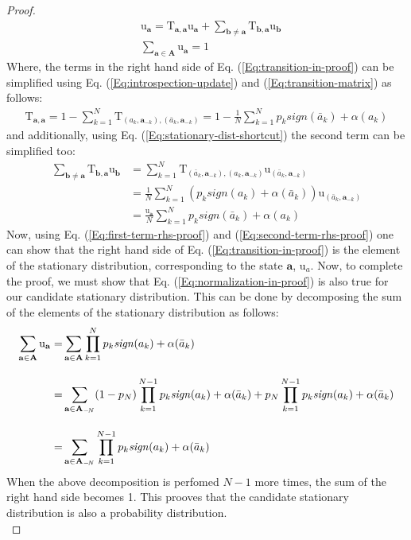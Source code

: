 \documentclass[11pt]{article}
\theoremstyle{plainCl1}
\theoremstyle{plainCl2}
\newcommand{\A}{\mathbf{A}}
\newcommand{\abf}{\mathbf{a}}
\newcommand{\bbf}{\mathbf{b}}
\begin{document}
\begin{proof}
\begin{align}
\label{Eq:transition-in-proof}
&\mathrm{u}_\abf = \mathrm{T}_{\abf,\abf} \mathrm{u}_\abf  + \sum_{\bbf \neq \abf} \mathrm{T}_{\bbf, \abf} \mathrm{u}_{\bbf}  \\[10pt] 
\label{Eq:normalization-in-proof}
&\sum_{\abf \in \A} \mathrm{u}_{\abf}= 1
\end{align}
Where, the terms in the right hand side of Eq. (\ref{Eq:transition-in-proof}) can be simplified using Eq. (\ref{Eq:introspection-update}) and (\ref{Eq:transition-matrix}) as follows:
\begin{eqnarray}
\mathrm{T}_{\abf,\abf} = 1 - \sum_{k=1}^{N} \mathrm{T}_{(a_k, \abf_{-k}), (\bar{a}_k,\abf_{-k})} = 1 - \frac{1}{N} \sum_{k=1}^{N} p_k \textit{sign}(\bar{a}_k) + \alpha(a_k)
\label{Eq:first-term-rhs-proof}
\end{eqnarray} 
and additionally, using Eq. (\ref{Eq:stationary-dist-shortcut}) the second term can be simplified too:
\begin{align}
\sum_{\bbf \neq \abf} \mathrm{T}_{\bbf, \abf} \mathrm{u}_{\bbf} &= \sum_{k = 1}^N \mathrm{T}_{(\bar{a}_k,\abf_{-k}), (a_k, \abf_{-k})} \mathrm{u}_{(\bar{a}_k,\abf_{-k})} \\[10pt]
&= \frac{1}{N} \sum_{k = 1}^N \left(p_k \textit{sign}(a_k) +\alpha(\bar{a}_k) \right) \mathrm{u}_{(\bar{a}_k,\abf_{-k})} \\[10pt] 
\label{Eq:second-term-rhs-proof}
&= \frac{\mathrm{u}_\abf}{N} \sum_{k=1}^{N} p_k \textit{sign}(\bar{a}_k) + \alpha(a_k) 
\end{align}
Now, using Eq. (\ref{Eq:first-term-rhs-proof}) and (\ref{Eq:second-term-rhs-proof}) one can show that the right hand side of Eq. (\ref{Eq:transition-in-proof}) is the element of the stationary distribution, corresponding to the state $\abf$, $\mathrm{u}_a$.  Now, to complete the proof, we must show that Eq. (\ref{Eq:normalization-in-proof}) is also true for our candidate stationary distribution. This can be done by decomposing the sum of the elements of the stationary distribution as follows:
\begin{align}
\sum_{\abf \in \A} \mathrm{u}_{\abf} =& \displaystyle \sum_{\abf \in \A} \prod_{k=1}^N p_k \mathit{sign}(a_k) + \alpha(\bar{a}_k) \\[10pt]
=& \displaystyle \displaystyle \sum_{\abf \in \A_{-\!N}} (1-p_N)  \prod_{k=1}^{N-1} p_k \mathit{sign}(a_k) + \alpha(\bar{a}_k)  + p_N  \prod_{k=1}^{N-1} p_k \mathit{sign}(a_k) + \alpha(\bar{a}_k) \\[10pt]
=& \displaystyle \sum_{\abf \in \A_{-\!N}} \prod_{k=1}^{N-1} p_k \mathit{sign}(a_k) + \alpha(\bar{a}_k)
\end{align}
When the above decomposition is perfomed $N-1$ more times, the sum of the right hand side becomes 1. This prooves that the candidate stationary distribution is also a probability distribution.\\
\end{proof}
\end{document}
